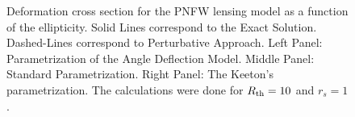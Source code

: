 \begin{figure}[!ht]
{}
\caption{\label{dcs_pnfw_e_pm} Deformation cross section for the  PNFW lensing
model as a function of the ellipticity. Solid Lines correspond to the Exact
Solution. Dashed-Lines correspond to Perturbative Approach. Left Panel:
Parametrization of the Angle Deflection Model. Middle Panel: Standard
Parametrization. Right Panel: The Keeton's parametrization. The calculations
were done for $R_{\rm th}=10$ and $r_s=1$.}
\end{figure}

